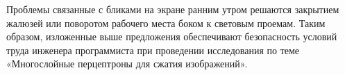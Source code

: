 Проблемы связанные с бликами на экране ранним утром решаются закрытием жалюзей или поворотом рабочего места боком к световым проемам.
Таким образом, изложенные выше предложения обеспечивают безопасность условий труда инженера программиста при проведении исследования по теме «Многослойные перцептроны для сжатия изображений».
